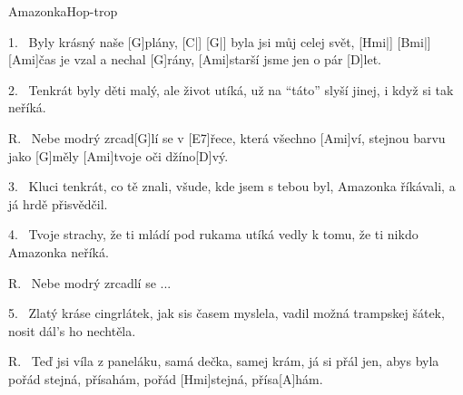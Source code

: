 \pagestyle{empty}

\begin{song}{Amazonka}{Hop-trop}

\begin{xverse}{1.~}
Byly krásný naše [G]plány, [C|]{} [G|]{}
byla jsi můj celej svět, [Hmi|]{} [Bmi|]{}
[Ami]{}čas je vzal a nechal [G]rány,
[Ami]starší jsme jen o pár [D]let.
\end{xverse}

\begin{xverse}{2.~}
Tenkrát byly děti malý, ale život utíká,
už na ``táto'' slyší jinej, i když si tak neříká.
\end{xverse}

\begin{xverse}{R.~}
Nebe modrý zrcad[G]lí se
v [E7]{}řece, která všechno [Ami]ví,
stejnou barvu jako [G]měly
[Ami]tvoje oči džíno[D]vý.
\end{xverse}

\begin{xverse}{3.~}
Kluci tenkrát, co tě znali,  všude, kde jsem s tebou byl,
Amazonka říkávali, a já hrdě přisvědčil.
\end{xverse}

\begin{xverse}{4.~}
Tvoje strachy, že ti mládí pod rukama utíká
vedly k tomu, že ti nikdo Amazonka neříká.
\end{xverse}

\begin{xverse}{R.~}
Nebe modrý zrcadlí se ...
\end{xverse}

\begin{xverse}{5.~}
Zlatý kráse cingrlátek, jak sis časem myslela,
vadil možná trampskej šátek, nosit dál's ho nechtěla.
\end{xverse}

\begin{xverse}{R.~}
Teď jsi víla z paneláku, samá dečka, samej krám,
já si přál jen, abys byla pořád stejná, přísahám,
pořád [Hmi]stejná, přísa[A]hám.
\end{xverse}

\end{song}

\setcounter{page}{1}

